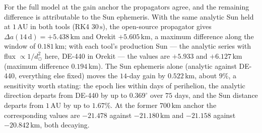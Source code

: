 \vspace{5pt}
\par\noindent For the full model at the gain anchor the propagators agree, and the remaining difference is attributable to the Sun ephemeris. With the same analytic Sun held at \(1\,\mathrm{AU}\) in both tools (RK4 \(30\,\mathrm{s}\)), the open-source propagator gives \(\Delta a(14\,\mathrm{d}) = +5.438\,\mathrm{km}\) and Orekit \(+5.605\,\mathrm{km}\), a maximum difference along the window of \(0.181\,\mathrm{km}\); with each tool's production Sun --- the analytic series with flux \(\propto 1/d_{\odot}^2\) here, DE-440 in Orekit --- the values are \(+5.933\) and \(+6.127\,\mathrm{km}\) (maximum difference \(0.194\,\mathrm{km}\)). The Sun ephemeris alone (analytic against DE-440, everything else fixed) moves the \(14\)-day gain by \(0.522\,\mathrm{km}\), about \(9\%\), a sensitivity worth stating: the epoch lies within days of perihelion, the analytic direction departs from DE-440 by up to \(0.369^\circ\) over \(75\) days, and the Sun distance departs from \(1\,\mathrm{AU}\) by up to \(1.67\%\). At the former \(700\,\mathrm{km}\) anchor the corresponding values are \(-21.478\) against \(-21.180\,\mathrm{km}\) and \(-21.158\) against \(-20.842\,\mathrm{km}\), both decaying.

